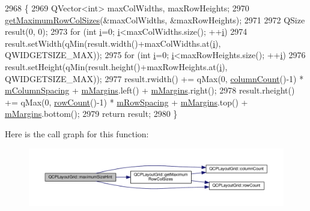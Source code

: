 \begin{DoxyCode}
2968 \{
2969   QVector<int> maxColWidths, maxRowHeights;
2970   \hyperlink{class_q_c_p_layout_grid_af348d903e3b8bc416f1fe1b8125d1173}{getMaximumRowColSizes}(&maxColWidths, &maxRowHeights);
2971   
2972   QSize result(0, 0);
2973   \textcolor{keywordflow}{for} (\textcolor{keywordtype}{int} \hyperlink{_comparision_pictures_2_createtest_image_8m_a6f6ccfcf58b31cb6412107d9d5281426}{i}=0; \hyperlink{_comparision_pictures_2_createtest_image_8m_a6f6ccfcf58b31cb6412107d9d5281426}{i}<maxColWidths.size(); ++\hyperlink{_comparision_pictures_2_createtest_image_8m_a6f6ccfcf58b31cb6412107d9d5281426}{i})
2974     result.setWidth(qMin(result.width()+maxColWidths.at(\hyperlink{_comparision_pictures_2_createtest_image_8m_a6f6ccfcf58b31cb6412107d9d5281426}{i}), QWIDGETSIZE\_MAX));
2975   \textcolor{keywordflow}{for} (\textcolor{keywordtype}{int} \hyperlink{_comparision_pictures_2_createtest_image_8m_a6f6ccfcf58b31cb6412107d9d5281426}{i}=0; \hyperlink{_comparision_pictures_2_createtest_image_8m_a6f6ccfcf58b31cb6412107d9d5281426}{i}<maxRowHeights.size(); ++\hyperlink{_comparision_pictures_2_createtest_image_8m_a6f6ccfcf58b31cb6412107d9d5281426}{i})
2976     result.setHeight(qMin(result.height()+maxRowHeights.at(\hyperlink{_comparision_pictures_2_createtest_image_8m_a6f6ccfcf58b31cb6412107d9d5281426}{i}), QWIDGETSIZE\_MAX));
2977   result.rwidth() += qMax(0, \hyperlink{class_q_c_p_layout_grid_ac39074eafd148b82d0762090f258189e}{columnCount}()-1) * \hyperlink{class_q_c_p_layout_grid_ae9ac48f0791be07ead0a96dbd5622770}{mColumnSpacing} + 
      \hyperlink{class_q_c_p_layout_element_ac2a32b99ee527ca5dfff9da03628fe94}{mMargins}.left() + \hyperlink{class_q_c_p_layout_element_ac2a32b99ee527ca5dfff9da03628fe94}{mMargins}.right();
2978   result.rheight() += qMax(0, \hyperlink{class_q_c_p_layout_grid_af8e6c7a05864ebe610c87756c7b9079c}{rowCount}()-1) * \hyperlink{class_q_c_p_layout_grid_a8b67f183f4645739cc4c794d75843b40}{mRowSpacing} + 
      \hyperlink{class_q_c_p_layout_element_ac2a32b99ee527ca5dfff9da03628fe94}{mMargins}.top() + \hyperlink{class_q_c_p_layout_element_ac2a32b99ee527ca5dfff9da03628fe94}{mMargins}.bottom();
2979   \textcolor{keywordflow}{return} result;
2980 \}
\end{DoxyCode}


Here is the call graph for this function\+:\nopagebreak
\begin{figure}[H]
\begin{center}
\leavevmode
\includegraphics[width=350pt]{class_q_c_p_layout_grid_a1ec4bf5914900a51829a7919f74aa58c_cgraph}
\end{center}
\end{figure}


